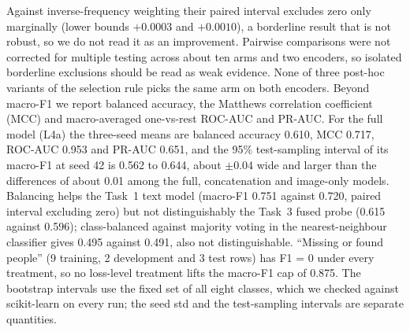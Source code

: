 Against inverse-frequency weighting their paired interval excludes zero only marginally (lower bounds $+0.0003$ and $+0.0010$), a borderline result that is not robust, so we do not read it as an improvement.
Pairwise comparisons were not corrected for multiple testing across about ten arms and two encoders, so isolated borderline exclusions should be read as weak evidence.
None of three post-hoc variants of the selection rule picks the same arm on both encoders.
Beyond macro-F1 we report balanced accuracy, the Matthews correlation coefficient (MCC) and macro-averaged one-vs-rest ROC-AUC and PR-AUC.
For the full model (L4a) the three-seed means are balanced accuracy 0.610, MCC 0.717, ROC-AUC 0.953 and PR-AUC 0.651, and the 95\% test-sampling interval of its macro-F1 at seed 42 is 0.562 to 0.644, about $\pm 0.04$ wide and larger than the differences of about 0.01 among the full, concatenation and image-only models.
Balancing helps the Task~1 text model (macro-F1 0.751 against 0.720, paired interval excluding zero) but not distinguishably the Task~3 fused probe (0.615 against 0.596); class-balanced against majority voting in the nearest-neighbour classifier gives 0.495 against 0.491, also not distinguishable.
``Missing or found people'' (9 training, 2 development and 3 test rows) has F1 = 0 under every treatment, so no loss-level treatment lifts the macro-F1 cap of 0.875.
The bootstrap intervals use the fixed set of all eight classes, which we checked against scikit-learn on every run; the seed std and the test-sampling intervals are separate quantities.
